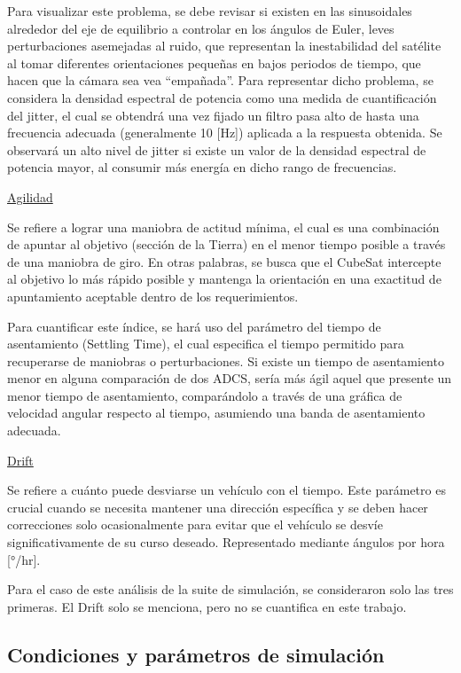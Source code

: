Para visualizar este problema, se debe revisar si existen en las sinusoidales alrededor del eje de equilibrio a controlar en los ángulos de Euler, leves perturbaciones asemejadas al ruido, que representan la inestabilidad del satélite al tomar diferentes orientaciones pequeñas en bajos periodos de tiempo, que hacen que la cámara sea vea “empañada”. Para representar dicho problema, se considera la densidad espectral de potencia como una medida de cuantificación del jitter, el cual se obtendrá una vez fijado un filtro pasa alto de hasta una frecuencia adecuada (generalmente 10 [Hz]) aplicada a la respuesta obtenida. Se observará un alto nivel de jitter si existe un valor de la densidad espectral de potencia mayor, al consumir más energía en dicho rango de frecuencias.


\underline{Agilidad \cite{ref5, ref11}}

Se refiere a lograr una maniobra de actitud mínima, el cual es una combinación de apuntar al objetivo (sección de la Tierra) en el menor tiempo posible a través de una maniobra de giro. En otras palabras, se busca que el CubeSat intercepte al objetivo lo más rápido posible y mantenga la orientación en una exactitud de apuntamiento aceptable dentro de los requerimientos.

Para cuantificar este índice, se hará uso del parámetro del tiempo de asentamiento (Settling Time), el cual especifica el tiempo permitido para recuperarse de maniobras o perturbaciones. Si existe un tiempo de asentamiento menor en alguna comparación de dos ADCS, sería más ágil aquel que presente un menor tiempo de asentamiento, comparándolo a través de una gráfica de velocidad angular respecto al tiempo, asumiendo una banda de asentamiento adecuada.

\underline{Drift \cite{ref5}}

Se refiere a cuánto puede desviarse un vehículo con el tiempo. Este parámetro es crucial cuando se necesita mantener una dirección específica y se deben hacer correcciones solo ocasionalmente para evitar que el vehículo se desvíe significativamente de su curso deseado. Representado mediante ángulos por hora [°/hr].

Para el caso de este análisis de la suite de simulación, se consideraron solo las tres primeras. El Drift solo se menciona, pero no se cuantifica en este trabajo.

\subsection{Condiciones y parámetros de simulación}

